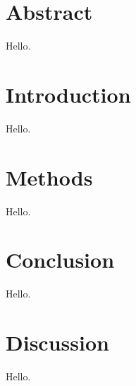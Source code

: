 \documentclass{article}
\begin{document}
\section{Abstract}

Hello.

\section{Introduction}

Hello.

\section{Methods}

Hello.

\section{Conclusion}

Hello.

\section{Discussion}

Hello.
\end{document}

